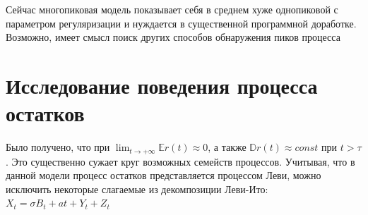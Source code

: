 \documentclass{article}
\begin{document}
Сейчас многопиковая модель показывает себя в среднем хуже однопиковой с параметром регуляризации и нуждается в существенной программной доработке. Возможно, имеет смысл поиск других способов обнаружения пиков процесса

\section{Исследование поведения процесса остатков}

Было получено, что при $\lim_{t \to +\infty} \mathbb{E} r(t) \approx 0$, а также $\mathbb{D} r(t) \approx const$ при $t > \tau$. Это существенно сужает круг возможных семейств процессов. Учитывая, что в данной модели процесс остатков представляется процессом Леви, можно исключить некоторые слагаемые из декомпозиции Леви-Ито: \newline $ X_t = \sigma B_t + at + Y_t + Z_t $
\end{document}
